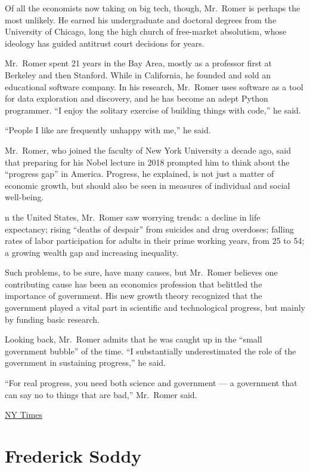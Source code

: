 \documentclass[
]{book}
\begin{document}
Of all the economists now taking on big tech, though, Mr.~Romer is perhaps the most unlikely. He earned his undergraduate and doctoral degrees from the University of Chicago, long the high church of free-market absolutism, whose ideology has guided antitrust court decisions for years.

Mr.~Romer spent 21 years in the Bay Area, mostly as a professor first at Berkeley and then Stanford. While in California, he founded and sold an educational software company. In his research, Mr.~Romer uses software as a tool for data exploration and discovery, and he has become an adept Python programmer. ``I enjoy the solitary exercise of building things with code,'' he said.

``People I like are frequently unhappy with me,'' he said.

Mr.~Romer, who joined the faculty of New York University a decade ago, said that preparing for his Nobel lecture in 2018 prompted him to think about the ``progress gap'' in America. Progress, he explained, is not just a matter of economic growth, but should also be seen in measures of individual and social well-being.

n the United States, Mr.~Romer saw worrying trends: a decline in life expectancy; rising ``deaths of despair'' from suicides and drug overdoses; falling rates of labor participation for adults in their prime working years, from 25 to 54; a growing wealth gap and increasing inequality.

Such problems, to be sure, have many causes, but Mr.~Romer believes one contributing cause has been an economics profession that belittled the importance of government. His new growth theory recognized that the government played a vital part in scientific and technological progress, but mainly by funding basic research.

Looking back, Mr.~Romer admits that he was caught up in the ``small government bubble'' of the time. ``I substantially underestimated the role of the government in sustaining progress,'' he said.

``For real progress, you need both science and government --- a government that can say no to things that are bad,'' Mr.~Romer said.

\href{https://www.nytimes.com/2021/05/20/technology/tech-antitrust-paul-romer.html}{NY Times}

\hypertarget{frederick-soddy}{%
\section{Frederick Soddy}\label{frederick-soddy}}
\end{document}
